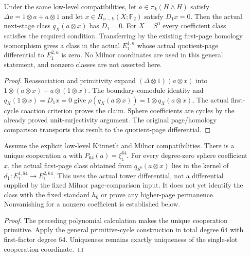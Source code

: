 \begin{proposition}
  \label{prop:h6-primitive-next-stage-cycle}
  \leanok
  Under the same low-level compatibilities, let $a\in\pi_k(H\wedge H)$
  satisfy $\Delta a=1\otimes a+a\otimes1$ and let
  $x\in H_{n-k}(X;\mathbb F_2)$ satisfy $D_1x=0$.
  Then the actual next-stage class $q_X(a\otimes x)$ has $D_1=0$.
  For $X=S^0$ every coefficient class satisfies the required condition.
  Transferring by the existing first-page homology isomorphism gives
  a class in the actual $E_1^{1,n}$ whose actual quotient-page
  differential to $E_1^{2,n}$ is zero. No Milnor coordinates are used
  in this general statement, and nonzero classes are not asserted here.
\end{proposition}
\begin{proof}
  Reassociation and primitivity expand $(\Delta\otimes1)(a\otimes x)$
  into $1\otimes(a\otimes x)+a\otimes(1\otimes x)$.
  The boundary-comodule identity and $q_X(1\otimes x)=D_1x=0$
  give $\rho(q_X(a\otimes x))=1\otimes q_X(a\otimes x)$.
  The actual first-cycle coaction criterion proves the claim.
  Sphere coefficients are cycles by the already proved unit-surjectivity
  argument. The original page/homology comparison transports this result
  to the quotient-page differential.
  \leanok
\end{proof}

\begin{proposition}
  \label{prop:h6-polynomial-actual-first-cycle}
  \leanok
  Assume the explicit low-level K\"unneth and Milnor compatibilities.
  There is a unique cooperation $a$ with $P_{64}(a)=\xi_1^{64}$.
  For every degree-zero sphere coefficient $x$, the actual first-page
  class obtained from $q_{S^0}(a\otimes x)$ lies in the kernel of
  $d_1:E_1^{1,64}\to E_1^{2,64}$.
  This uses the actual tower differential, not a differential supplied
  by the fixed Milnor page-comparison input. It does not yet identify the
  class with the fixed standard $h_6$ or prove any higher-page permanence.
  Nonvanishing for a nonzero coefficient is established below.
\end{proposition}
\begin{proof}
  The preceding polynomial calculation makes the unique cooperation
  primitive. Apply the general primitive-cycle construction in total
  degree $64$ with first-factor degree $64$. Uniqueness remains exactly
  uniqueness of the single-slot cooperation coordinate.
  \leanok
\end{proof}


